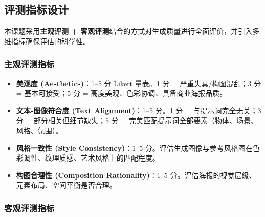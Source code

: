 \documentclass[10pt,a4paper]{article}
\begin{document}
\subsection{评测指标设计}

本课题采用\textbf{主观评测 + 客观评测}结合的方式对生成质量进行全面评价，并引入多维指标确保评估的科学性。

\subsubsection*{主观评测指标}

\begin{itemize}[itemsep=0pt,topsep=2pt]
    \item \textbf{美观度 (Aesthetics)}：1--5 分 Likert 量表。1 分 = 严重失真/构图混乱；3 分 = 基本可接受；5 分 = 高度美观、色彩协调、具备商业海报品质。
    \item \textbf{文本-图像符合度 (Text Alignment)}：1--5 分。1 分 = 与提示词完全无关；3 分 = 部分相关但细节缺失；5 分 = 完美匹配提示词全部要素（物体、场景、风格、氛围）。
    \item \textbf{风格一致性 (Style Consistency)}：1--5 分。评估生成图像与参考风格图在色彩调性、纹理质感、艺术风格上的匹配程度。
    \item \textbf{构图合理性 (Composition Rationality)}：1--5 分。评估海报的视觉层级、元素布局、空间平衡是否合理。
\end{itemize}

\subsubsection*{客观评测指标}
\end{document}
